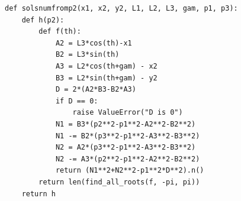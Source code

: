 \documentclass{article}
\begin{document}
\begin{verbatim}
def solsnumfromp2(x1, x2, y2, L1, L2, L3, gam, p1, p3):
    def h(p2):
        def f(th):
            A2 = L3*cos(th)-x1
            B2 = L3*sin(th)
            A3 = L2*cos(th+gam) - x2
            B3 = L2*sin(th+gam) - y2
            D = 2*(A2*B3-B2*A3)
            if D == 0:
                raise ValueError("D is 0")
            N1 = B3*(p2**2-p1**2-A2**2-B2**2)
            N1 -= B2*(p3**2-p1**2-A3**2-B3**2)
            N2 = A2*(p3**2-p1**2-A3**2-B3**2)
            N2 -= A3*(p2**2-p1**2-A2**2-B2**2)
            return (N1**2+N2**2-p1**2*D**2).n()
        return len(find_all_roots(f, -pi, pi))
    return h
\end{verbatim}
\end{document}
